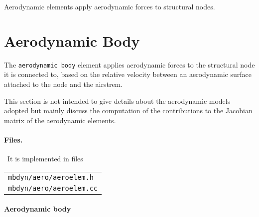 %
%
%
%
%
% 
%
%
%

Aerodynamic elements apply aerodynamic forces to structural nodes.

\section{Aerodynamic Body}
The \texttt{aerodynamic body} element applies aerodynamic forces
to the structural node it is connected to,
based on the relative velocity between an aerodynamic surface attached 
to the node and the airstrem.

This section is not intended 
to give details about the aerodynamic models adopted but mainly 
discuss the computation of the contributions to the Jacobian 
matrix of the aerodynamic elements.

\paragraph{Files.} \
It is implemented in files\\
\begin{tabular}{l}
\texttt{mbdyn/aero/aeroelem.h} \\
\texttt{mbdyn/aero/aeroelem.cc} 
\end{tabular}

\paragraph{Aerodynamic body}


